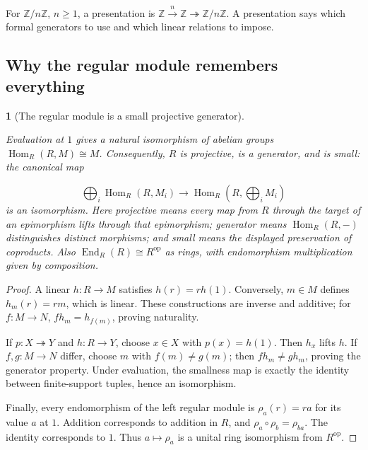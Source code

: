 \documentclass[11pt,a4paper]{article}
\newcommand{\mathheading}{}
\theoremstyle{plain}
\newtheorem*{plainstatement}{\mathheading}
\theoremstyle{definition}
\newenvironment{mathstatement}[3]{\renewcommand{\mathheading}{#1 #2}\begin{plainstatement}[#3]}{\end{plainstatement}}
\begin{document}
For \(\mathbb Z/n\mathbb Z\), \(n\geq1\), a presentation is \(\mathbb Z\xrightarrow{n}\mathbb Z\twoheadrightarrow\mathbb Z/n\mathbb Z\). A presentation says which formal generators to use and which linear relations to impose.

 
\subsection{Why the regular module remembers everything}
\label{generator}
 
\begin{mathstatement}{Theorem}{5.9}{The regular module is a small projective generator}
\label{env-5-9}

Evaluation at \(1\) gives a natural isomorphism of abelian groups \(\operatorname{Hom}_R(R,M)\cong M\). Consequently, \(R\) is projective, is a generator, and is small: the canonical map

 \[\bigoplus_i\operatorname{Hom}_R(R,M_i)\longrightarrow\operatorname{Hom}_R\left(R,\bigoplus_i M_i\right)\] 
is an isomorphism. Here \emph{projective} means every map from \(R\) through the target of an epimorphism lifts through that epimorphism; \emph{generator} means \(\operatorname{Hom}_R(R,-)\) distinguishes distinct morphisms; and \emph{small} means the displayed preservation of coproducts. Also \(\operatorname{End}_R(R)\cong R^{\mathrm{op}}\) as rings, with endomorphism multiplication given by composition.


\par{}\par

\end{mathstatement}
 
\begin{proof}

A linear \(h:R\to M\) satisfies \(h(r)=rh(1)\). Conversely, \(m\in M\) defines \(h_m(r)=rm\), which is linear. These constructions are inverse and additive; for \(f:M\to N\), \(fh_m=h_{f(m)}\), proving naturality.


If \(p:X\twoheadrightarrow Y\) and \(h:R\to Y\), choose \(x\in X\) with \(p(x)=h(1)\). Then \(h_x\) lifts \(h\). If \(f,g:M\to N\) differ, choose \(m\) with \(f(m)\ne g(m)\); then \(fh_m\ne gh_m\), proving the generator property. Under evaluation, the smallness map is exactly the identity between finite-support tuples, hence an isomorphism.


Finally, every endomorphism of the left regular module is \(\rho_a(r)=ra\) for its value \(a\) at \(1\). Addition corresponds to addition in \(R\), and \(\rho_a\circ\rho_b=\rho_{ba}\). The identity corresponds to \(1\). Thus \(a\mapsto\rho_a\) is a unital ring isomorphism from \(R^{\mathrm{op}}\).


\end{proof}
 
\end{document}
